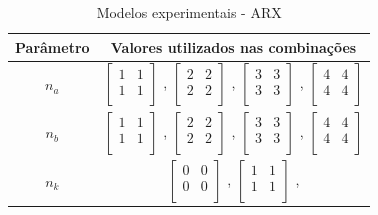 \begin{table}[h]
	\centering
	\caption{Modelos experimentais - ARX}
	\label{tab:tclabsp-models-arx}
	\begin{tabular}{c|c} \toprule
		{Parâmetro}		&	{Valores utilizados nas combinações}									\\ \midrule
		$n_a$			&
							$ \begin{bmatrix}	1	&	1	\\	1	&	1	\\	\end{bmatrix} $	,		
							$ \begin{bmatrix}	2	&	2	\\	2	&	2	\\	\end{bmatrix} $	,		
							$ \begin{bmatrix}	3	&	3	\\	3	&	3	\\	\end{bmatrix} $	,		
							$ \begin{bmatrix}	4	&	4	\\	4	&	4	\\	\end{bmatrix} $		\\ \midrule
		$n_b$			&
							$ \begin{bmatrix}	1	&	1	\\	1	&	1	\\	\end{bmatrix} $	,		
							$ \begin{bmatrix}	2	&	2	\\	2	&	2	\\	\end{bmatrix} $	,		
							$ \begin{bmatrix}	3	&	3	\\	3	&	3	\\	\end{bmatrix} $	,		
							$ \begin{bmatrix}	4	&	4	\\	4	&	4	\\	\end{bmatrix} $		\\ \midrule
		$n_k$			&
							$ \begin{bmatrix}	0	&	0	\\	0	&	0	\\	\end{bmatrix} $	,		
							$ \begin{bmatrix}	1	&	1	\\	1	&	1	\\	\end{bmatrix} $	,		

\end{tabular}
\end{table}

